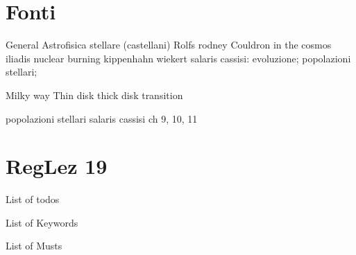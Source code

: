 \section{Fonti}

\begin{wordonframe}{General}
Astrofisica stellare (castellani)
Rolfs rodney Couldron in the cosmos
iliadis nuclear burning
kippenhahn wiekert
salaris cassisi: evoluzione; popolazioni stellari;
\end{wordonframe}

\begin{wordonframe}{Milky way}
Thin disk thick disk transition
\end{wordonframe}

\begin{wordonframe}{popolazioni stellari}
salaris cassisi ch 9, 10, 11
\end{wordonframe}

\section{RegLez 19}

\begin{frame}[allowframebreaks]{List of todos}
\listoftodos
\end{frame}

\begin{frame}[allowframebreaks]{List of Keywords}
\listofkeywords
\end{frame}

\begin{frame}[allowframebreaks]{List of Musts}
	\listofmusts
\end{frame}

